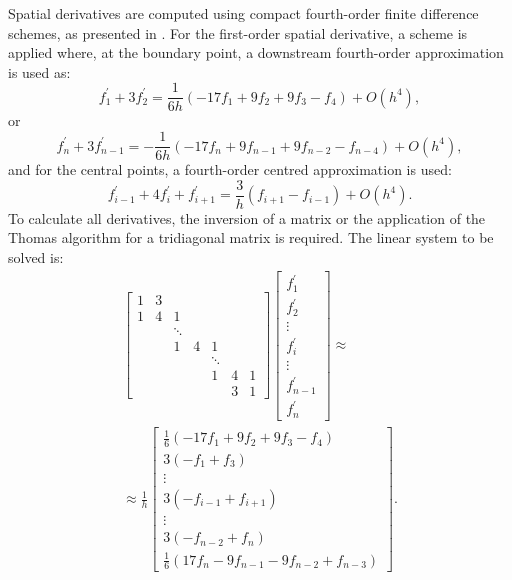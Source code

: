 \documentclass[preprint, 12pt]{elsarticle}
\begin{document}
Spatial derivatives are computed using compact fourth-order finite difference schemes, as presented in \citet{souza2003}. For the first-order spatial derivative, a scheme is applied where, at the boundary point, a downstream fourth-order approximation is used as:
\begin{equation}
    f_1^{\prime}+3 f_2^{\prime}=\frac{1}{ 6h}\left(-17f_1 + 9f_2 + 9f_3 - f_4 \right)+O\left(h^4\right),
\end{equation}
or
\begin{equation}
    f_n^{\prime} + 3f_{n-1}^{\prime} = -\frac{1}{ 6h}\left(-17f_{n} + 9f_{n-1} + 9f_{n-2} - f_{n-4} \right)+O\left(h^4\right),
\end{equation}
and for the central points, a fourth-order centred approximation is used:
\begin{equation}
    f_{i-1}^{\prime}+4 f_i^{\prime}+f_{i+1}^{\prime} = \frac{3}{ h}\left(f_{i+1}-f_{i-1}\right) +O\left(h^4\right).
\end{equation}
To calculate all derivatives, the inversion of a matrix or the application of the Thomas algorithm \cite{thomas1949} for a tridiagonal matrix is required. The linear system to be solved is:
\begin{align}
\left[\begin{array}{ccccccc}
    1 & 3 & & & & & \\
    1 & 4 & 1 & & & & \\
    & & \ddots & & & & \\
    & & 1 & 4 & 1 & & \\
    & & & & \ddots & & \\
    & & & & 1 & 4 & 1 \\
    & & & & & 3 & 1
\end{array}\right]\left[\begin{array}{c}
f_1^{\prime} \\
f_2^{\prime} \\
\vdots \\
f_i^{\prime} \\
\vdots \\
f_{n-1}^{\prime} \\
f_n^{\prime}
\end{array}\right] 
\approx \nonumber\\ \approx \frac{1}{h}\left[\begin{array}{c}\frac{1}{6}\left(-17f_1 + 9f_2 + 9f_3 - f_4 \right) \\ 3(- f_1 + f_3) \\ \vdots \\ 3\left(-f_{i-1}+f_{i+1}\right) \\ \vdots \\ 3\left(-f_{n-2}+f_{n}\right) \\ \frac{1}{6}\left(17f_n - 9f_{n-1} - 9f_{n-2} + f_{n-3}\right)\end{array}\right].
\end{align}
\end{document}
